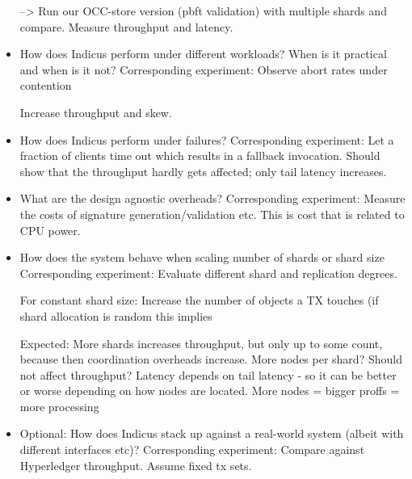 \begin{itemize}
--> Run our OCC-store version (pbft validation) with multiple shards and compare. Measure throughput and latency.

\item How does Indicus perform under different workloads? When is it practical and when is it not?
Corresponding experiment: Observe abort rates under contention

Increase throughput and skew. 


\item How does Indicus perform under failures?
Corresponding experiment: Let a fraction of clients time out which results in a fallback invocation. Should show that the throughput hardly gets affected; only tail latency increases.

\item What are the design agnostic overheads?
Corresponding experiment: Measure the costs of signature generation/validation etc. This is cost that is related to CPU power.

\item How does the system behave when scaling number of shards or shard size
Corresponding experiment: Evaluate different shard and replication degrees.

For constant shard size: Increase the number of objects a TX touches (if shard allocation is random this implies 

Expected: More shards increases throughput, but only up to some count, because then coordination overheads increase. More nodes per shard? Should not affect throughput? Latency depends on tail latency - so it can be better or worse depending on how nodes are located. More nodes = bigger proffs = more processing
\item Optional: How does Indicus stack up against a real-world system (albeit with different interfaces etc)?
Corresponding experiment: Compare against Hyperledger throughput. Assume fixed tx sets.
\end{itemize}




